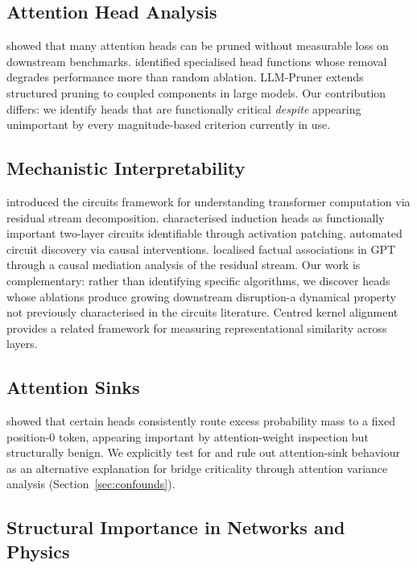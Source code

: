 \documentclass[11pt,a4paper]{article}
\theoremstyle{definition}
\theoremstyle{plain}
\begin{document}
\subsection{Attention Head Analysis}

\citet{michel2019sixteen} showed that many attention heads can be pruned
without measurable loss on downstream benchmarks.
\citet{voita2019analyzing} identified specialised head functions whose
removal degrades performance more than random ablation.
LLM-Pruner \citep{ma2023llmpruner} extends structured pruning to
coupled components in large models.
Our contribution differs: we identify heads that are functionally critical
\emph{despite} appearing unimportant by every magnitude-based criterion
currently in use.

\subsection{Mechanistic Interpretability}

\citet{elhage2021mathematical} introduced the circuits framework for
understanding transformer computation via residual stream decomposition.
\citet{olsson2022induction} characterised induction heads as functionally
important two-layer circuits identifiable through activation patching.
\citet{conmy2023acdc} automated circuit discovery via causal interventions.
\citet{meng2022rome} localised factual associations in GPT through a
causal mediation analysis of the residual stream.
Our work is complementary: rather than identifying specific algorithms, we
discover heads whose ablations produce growing downstream disruption-a
dynamical property not previously characterised in the circuits literature.
Centred kernel alignment \citep{kornblith2019cka} provides a related
framework for measuring representational similarity across layers.

\subsection{Attention Sinks}

\citet{xiao2024sinks} showed that certain heads consistently route excess
probability mass to a fixed position-0 token, appearing important by
attention-weight inspection but structurally benign.
We explicitly test for and rule out attention-sink behaviour as an
alternative explanation for bridge criticality through attention variance
analysis (Section~\ref{sec:confounds}).

\subsection{Structural Importance in Networks and Physics}
\end{document}
